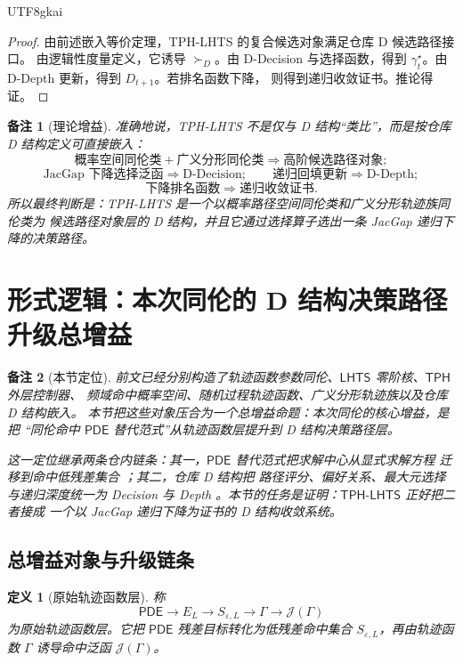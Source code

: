 \documentclass[12pt]{article}
\newtheorem{definition}{定义}[section]
\newtheorem{remark}{备注}[section]
\newcommand{\LHTS}{\ensuremath{\mathsf{LHTS}}}
\newcommand{\TPH}{\ensuremath{\mathsf{TPH}}}
\newcommand{\TPHLHTS}{\ensuremath{\mathsf{TPH\mbox{-}LHTS}}}
\newcommand{\PDE}{\ensuremath{\mathsf{PDE}}}
\begin{document}
\begin{CJK*}{UTF8}{gkai}
\begin{proof}
由前述嵌入等价定理，TPH-LHTS 的复合候选对象满足仓库 D 候选路径接口。
由逻辑性度量定义，它诱导 \(\succ_D\)。由 D-Decision 与选择函数，得到
\(\gamma_t^\star\)。由 D-Depth 更新，得到 \(D_{t+1}\)。若排名函数下降，
则得到递归收敛证书。推论得证。
\end{proof}

\begin{remark}[理论增益]
准确地说，TPH-LHTS 不是仅与 D 结构“类比”，而是按仓库 D 结构定义可直接嵌入：
\[
\boxed{
\text{概率空间同伦类}
+
\text{广义分形同伦类}
\Rightarrow
\text{高阶候选路径对象};
}
\]
\[
\boxed{
\text{JacGap 下降选择泛函}
\Rightarrow
\text{D-Decision};
\qquad
\text{递归回填更新}
\Rightarrow
\text{D-Depth};
}
\]
\[
\boxed{
\text{下降排名函数}
\Rightarrow
\text{递归收敛证书}.
}
\]
所以最终判断是：TPH-LHTS 是一个以概率路径空间同伦类和广义分形轨迹族同伦类为
候选路径对象层的 D 结构，并且它通过选择算子选出一条 JacGap 递归下降的决策路径。
\end{remark}

\section{形式逻辑：本次同伦的 D 结构决策路径升级总增益}
\label{sec:total-gain-d-decision-path-upgrade}

\begin{remark}[本节定位]
前文已经分别构造了轨迹函数参数同伦、\(\LHTS\) 零阶核、\(\TPH\) 外层控制器、
频域命中概率空间、随机过程轨迹函数、广义分形轨迹族以及仓库 D 结构嵌入。
本节把这些对象压合为一个总增益命题：本次同伦的核心增益，是把
“同伦命中 \(\PDE\) 替代范式”从轨迹函数层提升到 D 结构决策路径层。

这一定位继承两条仓内链条：其一，\(\PDE\) 替代范式把求解中心从显式求解方程
迁移到命中低残差集合 \cite{RepoTex55PDEParadigm}；其二，仓库 D 结构把
路径评分、偏好关系、最大元选择与递归深度统一为 Decision 与 Depth
\cite{RepoTex3DStructure}。本节的任务是证明：\(\TPHLHTS\) 正好把二者接成
一个以 JacGap 递归下降为证书的 D 结构收敛系统。
\end{remark}

\subsection{总增益对象与升级链条}
\label{subsec:total-gain-objects-chain}

\begin{definition}[原始轨迹函数层]
称
\[
\PDE
\to
E_L
\to
S_{\varepsilon,L}
\to
\Gamma
\to
\mathcal J(\Gamma)
\]
为原始轨迹函数层。它把 \(\PDE\) 残差目标转化为低残差命中集合
\(S_{\varepsilon,L}\)，再由轨迹函数 \(\Gamma\) 诱导命中泛函
\(\mathcal J(\Gamma)\)。
\end{definition}


\end{CJK*}
\end{document}
